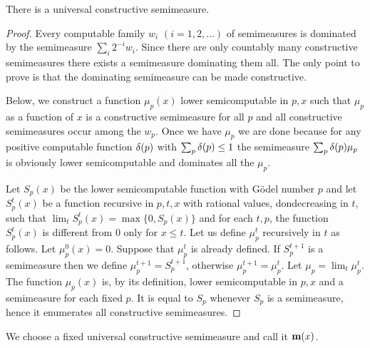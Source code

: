  \begin{theorem}
  \leanok
   \label{thm:univsem} 
There is a universal constructive semimeasure.
 \end{theorem}

\begin{proof}
  \leanok
 Every computable family \( w_{i} \) \( (i=1,2,\dotsc) \) of semimeasures is
dominated by the semimeasure \( \sum_{i} 2^{-i}w_{i} \). 
Since there are only
countably many constructive semimeasures there exists a semimeasure
dominating them all. 
The only point to prove is that the dominating
semimeasure can be made constructive. 

Below, we construct a function \( \mu_{p}(x) \) lower
semicomputable in \( p,x \) such 
that \( \mu_{p} \) as a function of \( x \) is a constructive semimeasure for
all \( p \) and all constructive semimeasures occur among the \( w_{p} \). 
Once we have \( \mu_{p} \) we are done because for any positive computable
function \( \delta(p) \) with \( \sum_{p} \delta(p) \le 1 \) the semimeasure 
\( \sum_{p} \delta(p) \mu_{p} \) is obviously lower
semicomputable and dominates all the
\( \mu_{p} \). 

Let \( S_{p}(x) \) be the lower semicomputable function with G\"odel number \( p \)
and let \( S_{p}^{t}(x) \) be a function recursive in \( p,t,x \) with rational
values, dondecreasing in \( t \), such that 
\( \lim_{t} S^{t}_{p}(x) = \max\{0,S_{p}(x)\} \) and for each \( t,p \), the function 
\( S_{p}^{t}(x) \) is
different from 0 only for \( x \le t \). Let us define \( \mu_{p}^{t} \)
recursively in \( t \) as follows. 
Let \( \mu_{p}^0(x) = 0 \). 
Suppose that \( \mu_{p}^{t} \) is already defined. 
If \( S_{p}^{t+1} \) is a semimeasure then we
define \( \mu_{p}^{t+1}=S_{p}^{t+1} \), otherwise \( \mu_{p}^{t+1} = \mu_{p}^{t} \).
Let \( \mu_{p} = \lim_{t} \mu_{p}^{t} \). 
The function \( \mu_{p}(x) \) is, by its
definition, lower semicomputable in \( p,x \) and a semimeasure for each fixed
\( p \). 
It is equal to \( S_{p} \) whenever \( S_{p} \) is a semimeasure, hence it
enumerates all constructive semimeasures.
 \end{proof}

\begin{definition}
  \leanok
  \label{def:m}
We choose a fixed universal constructive semimeasure and call it \( \mathbf{m}(x) \).
\end{definition}

